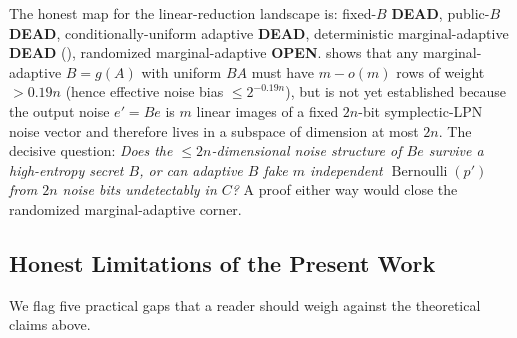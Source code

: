\documentclass[11pt,a4paper]{article}
\theoremstyle{plain}
\theoremstyle{definition}
\begin{document}
\begin{enumerate}
The honest map for the linear-reduction landscape is: fixed-$B$ \textbf{DEAD}, public-$B$ \textbf{DEAD}, conditionally-uniform adaptive \textbf{DEAD}, deterministic marginal-adaptive \textbf{DEAD} (), randomized marginal-adaptive \textbf{OPEN}.   shows that any marginal-adaptive $B=g(A)$ with uniform $BA$ must have $m-o(m)$ rows of weight $>0.19n$ (hence effective noise bias $\le 2^{-0.19n}$), but  is not yet established because the output noise $e'=Be$ is $m$ linear images of a fixed $2n$-bit symplectic-LPN noise vector and therefore lives in a subspace of dimension at most $2n$.  The decisive question: \emph{Does the $\le 2n$-dimensional noise structure of $Be$ survive a high-entropy secret $B$, or can adaptive $B$ fake $m$ independent $\operatorname{Bernoulli}(p')$ from $2n$ noise bits undetectably in $C$?}  A proof either way would close the randomized marginal-adaptive corner.
\end{enumerate}

\subsection{Honest Limitations of the Present Work}
\label{subsec:limitations}

We flag five practical gaps that a reader should weigh against the theoretical claims above.
\end{document}
